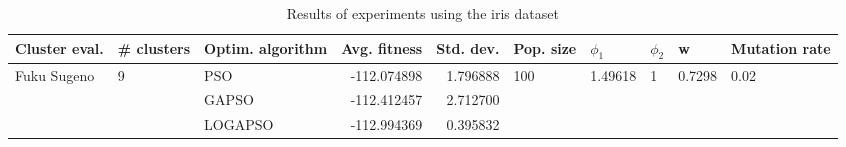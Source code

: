 \begin{table}
\centering
\caption{Results of experiments using the iris dataset}
\begin{tabular}{lllrrlllll}
\toprule
               Cluster eval. &        \# clusters & Optim. algorithm &  Avg. fitness &  Std. dev. &            Pop. size &               $\phi_{1}$ &         $\phi_{2}$ &                       w &         Mutation rate \\
\midrule
\multirow{3}{*}{Fuku Sugeno} & \multirow{3}{*}{9} &              PSO &   -112.074898 &   1.796888 & \multirow{3}{*}{100} & \multirow{3}{*}{1.49618} & \multirow{3}{*}{1} & \multirow{3}{*}{0.7298} & \multirow{3}{*}{0.02} \\
                             &                    &            GAPSO &   -112.412457 &   2.712700 &                      &                          &                    &                         &                       \\
                             &                    &          LOGAPSO &   -112.994369 &   0.395832 &                      &                          &                    &                         &                       \\
\bottomrule
\end{tabular}
\end{table}
